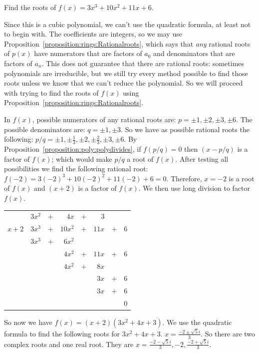 \begin{example}{}
Find the roots of $f(x)=3x^3+10x^2+11x+6$.

Since this is a cubic polynomial, we can't use the quadratic formula, at least not to begin with. The coefficients are integers, so we may use Proposition~\ref{proposition:rings:Rationalroots}, which says that \emph{any} rational roots of $p(x)$ have numerators that are factors of $a_{0}$ and denominators that  are factors of $a_{n}$. This does not guarantee that there are rational roots: sometimes polynomials are irreducible, but we still try every method possible to find those roots unless we know that we can't reduce the polynomial. So we will proceed with trying to find the roots of $f(x)$ using Proposition~\ref{proposition:rings:Rationalroots}.

In $f(x)$, possible numerators of any rational roots are: $p=\pm1, \pm2, \pm3, \pm6$. The possible denominators are: $q=\pm1, \pm3$.
So we have as possible rational roots the following: $p/q= \pm1, \pm\frac{1}{3}, \pm2, \pm\frac{2}{3},\pm3, \pm6$.
By Proposition~\ref{proposition:poly:polydivides}, if $f(p/q)=0$ then $(x-p/q)$ is a factor of $f(x)$; which would make $p/q$ a root of $f(x)$. After testing all possibilities we find the following rational root:
$f(-2)=3(-2)^3+10(-2)^2+11(-2)+6=0$. Therefore, $x=-2$ is a root of $f(x)$ and $(x+2)$ is a factor of $f(x)$.
We then use long division to factor $f(x)$.

\begin{center}
\begin{tabular}{rrcrcrcr}
        &  $3x^2$  &  $+$  &      $4x$  &  $+$  &    $3$  &       &       \\ \cline{2-8}
 \multicolumn{1}{r|}{$x + 2$}
        &  $3x^3$  &  $+$  &    $10x^2$  &  $+$  & $ 11x$  &  $+$  &  $6$  \\
        &  $3x^3$  &  $+$  &    $6 x^2$  &       &         &       &       \\ \cline{2-8}
        &         &       &                $4x^2$  & $+$  &  $ 11x$  &  $+$  &  $6$  \\
        &         &       &                $4x^2$  &  $+$  & $ 8x$  &       &       \\ \cline{4-8}
        &         &       &           &       &                         $3 x$  & $+$  & $6$  \\
        &         &       &           &       &                          $3x$  & $+$  & $6$  \\ \cline{6-8}
        &         &       &           &       &         &       &                               $0$
\end{tabular}
\end{center}
So now we have $f(x)=(x+2)(3x^2+4x+3)$. We use the quadratic formula to find the following roots for $3x^2+4x+3$.
$x=\frac{-2\pm \sqrt{5}i}{3}$.
So there are two complex roots and one real root. They are $x={\frac{-2 - \sqrt{5}i}{3}, -2, \frac{-2+ \sqrt{5}i}{3}}$.
\end{example}

